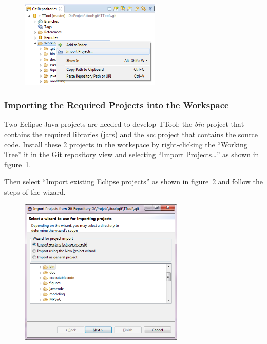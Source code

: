 \documentclass[12pt]{article}
\begin{document}
\begin{figure}[H]
\begin{center}
\includegraphics[width=0.6\textwidth]{images/image5.png}
\end{center}
\caption{}
\label{fig:image5}
\end{figure}

\subsubsection{Importing the Required Projects into the Workspace}
\label{sec:import}

Two Eclipse Java projects are needed to develop TTool: the \textit{bin} project
that contains the required libraries (jars) and the \textit{src} project that
contains the source code. Install these 2 projects in the workspace by
right-clicking the ``Working Tree'' it in the Git repository view and
selecting ``Import Projects\ldots'' as shown in figure~\ref{fig:image5}.

Then select ``Import existing Eclipse projects'' as shown in
figure~\ref{fig:image6} and follow the steps of the wizard.

\begin{figure}[H]
\begin{center}
\includegraphics[width=0.7\textwidth]{images/image6.png}
\end{center}
\caption{}
\label{fig:image6}
\end{figure}
\end{document}
